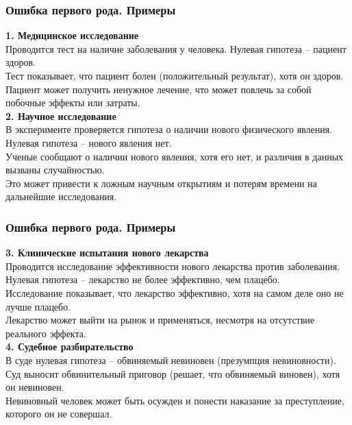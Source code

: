\documentclass[aspectratio=169]{beamer}
\begin{document}
\begin{frame}
\frametitle{Ошибка первого рода. Примеры}
{\bf 1. Медицинское исследование}\\
 Проводится тест на наличие заболевания у человека. Нулевая гипотеза -- пациент здоров.\\
 Тест показывает, что пациент болен (положительный результат), хотя он здоров.\\
 Пациент может получить ненужное лечение, что может повлечь за собой побочные эффекты или затраты.
\newline\\
{\bf 2. Научное исследование}\\
 В эксперименте проверяется гипотеза о наличии нового физического явления. Нулевая гипотеза -- нового явления нет.\\
 Ученые сообщают о наличии нового явления, хотя его нет, и различия в данных вызваны случайностью.\\
 Это может привести к ложным научным открытиям и потерям времени на дальнейшие исследования.
\end{frame}

\begin{frame}
\frametitle{Ошибка первого рода. Примеры}
{\bf 3. Клинические испытания нового лекарства}\\
 Проводится исследование эффективности нового лекарства против заболевания. Нулевая гипотеза -- лекарство не более эффективно, чем плацебо.\\
 Исследование показывает, что лекарство эффективно, хотя на самом деле оно не лучше плацебо.\\
 Лекарство может выйти на рынок и применяться, несмотря на отсутствие реального эффекта.
\newline\\
{\bf  4. Судебное разбирательство}\\
 В суде нулевая гипотеза -- обвиняемый невиновен (презумпция невиновности).\\
 Суд выносит обвинительный приговор (решает, что обвиняемый виновен), хотя он невиновен.\\
 Невиновный человек может быть осужден и понести наказание за преступление, которого он не совершал.
\end{frame}
\end{document}
